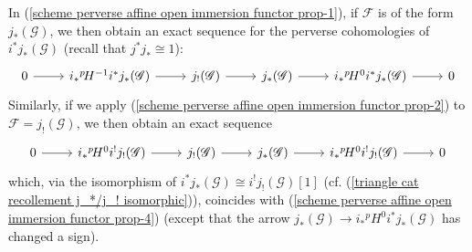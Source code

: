 \begin{remark}\label{scheme perverse affine open immersion j_* exact sequence}
In (\ref{scheme perverse affine open immersion functor prop-1}), if $\mathscr{F}$ is of the form $j_*(\mathscr{G})$, we then obtain an exact sequence for the perverse cohomologies of $i^*j_*(\mathscr{G})$ (recall that $j^*j_*\cong 1$):
\begin{equation}\label{scheme perverse affine open immersion functor prop-3}
\begin{tikzcd}
0\ar[r]&i_*{^p\!H^{-1}}i^*j_*(\mathscr{G})\ar[r]&j_!(\mathscr{G})\ar[r]&j_*(\mathscr{G})\ar[r]&i_*{^p\!H^0}i^*j_*(\mathscr{G})\ar[r]&0
\end{tikzcd}
\end{equation}
Similarly, if we apply (\ref{scheme perverse affine open immersion functor prop-2}) to $\mathscr{F}=j_!(\mathscr{G})$, we then obtain an exact sequence
\begin{equation}\label{scheme perverse affine open immersion functor prop-4}
\begin{tikzcd}
0\ar[r]&i_*{^p\!H^{0}}i^!j_!(\mathscr{G})\ar[r]&j_!(\mathscr{G})\ar[r]&j_*(\mathscr{G})\ar[r]&i_*{^p\!H^0}i^!j_!(\mathscr{G})\ar[r]&0
\end{tikzcd}
\end{equation}
which, via the isomorphism of $i^*j_*(\mathscr{G})\cong i^!j_!(\mathscr{G})[1]$ (cf. (\ref{triangle cat recollement j_*/j_! isomorphic})), coincides with (\ref{scheme perverse affine open immersion functor prop-4}) (except that the arrow $j_*(\mathscr{G})\to i_*{^p\!H^0}i^*j_*(\mathscr{G})$ has changed a sign). 
\end{remark}


